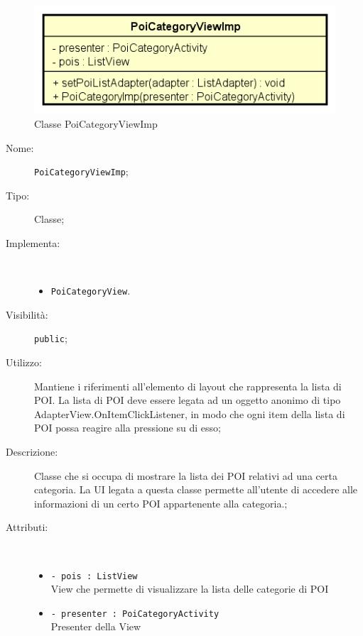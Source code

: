 \documentclass[../DefinizioneDiProdotto.tex]{subfiles}
\begin{document}
    \begin{figure}[H]
        \centering
        \includegraphics{img/PoiCategoryViewImp.png}
        \caption{Classe PoiCategoryViewImp}\label{fig:view::PoiCategoryViewImp} 
    \end{figure}
    \begin{description}
\item[Nome:] \texttt{PoiCategoryViewImp};
\item[Tipo:] Classe;
\item[Implementa:] \
\begin{itemize}
\item \texttt{PoiCategoryView}.

\end{itemize}
\item[Visibilità:] \texttt{public};
\item[Utilizzo:] Mantiene i riferimenti all'elemento di layout che rappresenta la lista di POI. La lista di POI deve essere legata ad un oggetto anonimo di tipo AdapterView.OnItemClickListener, in modo che ogni item della lista di POI possa reagire alla pressione su di esso;
\item[Descrizione:] Classe che si occupa di mostrare la lista dei POI relativi ad una certa categoria. La UI legata a questa classe permette all'utente di accedere alle informazioni di un certo POI appartenente alla categoria.;
\item[Attributi:] \
\begin{itemize}
\item \texttt{- pois : ListView}\\
View che permette di visualizzare la lista delle categorie di POI

\item \texttt{- presenter : PoiCategoryActivity}\\
Presenter della View


\end{itemize}
\end{description}
\end{document}
